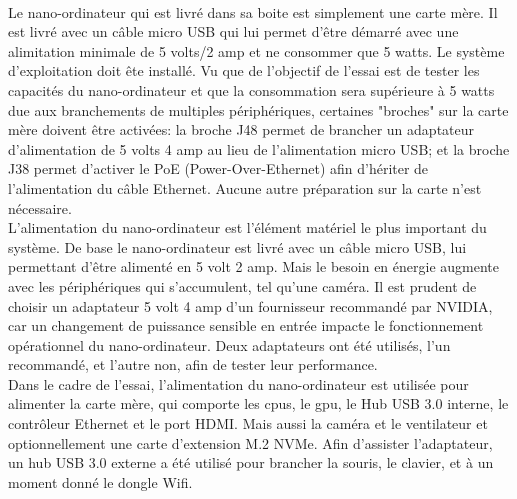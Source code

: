 \vspace{\baselineskip}
\\
\noindent Le nano-ordinateur qui est livré dans sa boite est simplement une carte mère. Il est livré avec un câble micro USB qui lui permet d'être démarré avec une alimitation minimale de 5 volts/2 amp et ne consommer que 5 watts. Le système d'exploitation doit ête installé. Vu que de l'objectif de l'essai est de tester les capacités du nano-ordinateur et que la consommation sera supérieure à 5 watts due aux branchements de multiples périphériques, certaines "broches" sur la carte mère doivent être activées: la broche J48 permet de brancher un adaptateur d'alimentation de 5 volts 4 amp au lieu de l'alimentation micro USB; et la broche J38 permet d'activer le PoE (Power-Over-Ethernet) afin d'hériter de l'alimentation du câble Ethernet. Aucune autre préparation sur la carte n'est nécessaire.
{
\vspace{\baselineskip}
\\
\noindent L'alimentation du nano-ordinateur est l'élément matériel le plus important du système. De base le nano-ordinateur est livré avec un câble micro USB, lui permettant d'être alimenté en 5 volt 2 amp. Mais le besoin en énergie augmente avec les périphériques qui s'accumulent, tel qu'une caméra. Il est prudent de choisir un adaptateur 5 volt 4 amp d'un fournisseur recommandé par NVIDIA, car un changement de puissance sensible en entrée impacte le fonctionnement opérationnel du nano-ordinateur. Deux adaptateurs ont été utilisés, l'un recommandé, et l'autre non, afin de tester leur performance. 
\vspace{\baselineskip}
\\
\noindent Dans le cadre de l'essai, l'alimentation du nano-ordinateur est utilisée pour alimenter la carte mère, qui comporte les \acrshort{cpu}s, le \acrshort{gpu}, le Hub USB 3.0 interne, le contrôleur Ethernet et le port HDMI. Mais aussi la caméra et le ventilateur et optionnellement une carte d'extension M.2 NVMe. Afin d'assister l'adaptateur, un hub USB 3.0 externe a été utilisé pour brancher la souris, le clavier, et à un moment donné le dongle Wifi.
}
